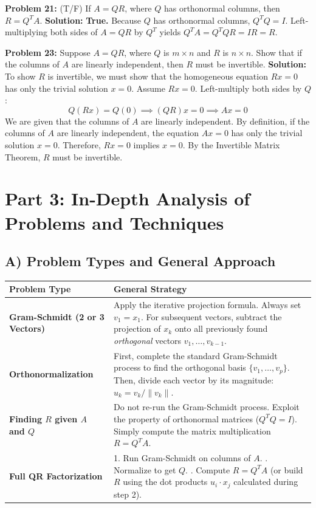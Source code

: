 \documentclass[11pt, letterpaper]{article}
\theoremstyle{definition}
\theoremstyle{remark}
\begin{document}
\vspace{1em}
\textbf{Problem 21:} (T/F) If $A = QR$, where $Q$ has orthonormal columns, then $R = Q^T A$.
\textbf{Solution:} \textbf{True.} Because $Q$ has orthonormal columns, $Q^T Q = I$. Left-multiplying both sides of $A = QR$ by $Q^T$ yields $Q^T A = Q^T Q R = I R = R$.

\vspace{1em}
\textbf{Problem 23:} Suppose $A = QR$, where $Q$ is $m \times n$ and $R$ is $n \times n$. Show that if the columns of $A$ are linearly independent, then $R$ must be invertible.
\textbf{Solution:} 
To show $R$ is invertible, we must show that the homogeneous equation $Rx = 0$ has only the trivial solution $x = 0$.
Assume $Rx = 0$. 
Left-multiply both sides by $Q$:
\[ Q(Rx) = Q(0) \implies (QR)x = 0 \implies Ax = 0 \]
We are given that the columns of $A$ are linearly independent. By definition, if the columns of $A$ are linearly independent, the equation $Ax = 0$ has only the trivial solution $x = 0$.
Therefore, $Rx = 0$ implies $x = 0$. By the Invertible Matrix Theorem, $R$ must be invertible.

\newpage
\section{Part 3: In-Depth Analysis of Problems and Techniques}

\subsection{A) Problem Types and General Approach}

\renewcommand{\arraystretch}{1.5}
\begin{tabularx}{\textwidth}{>{\raggedright\arraybackslash}p{4cm} X}
\toprule
\textbf{Problem Type} & \textbf{General Strategy} \\
\midrule
\textbf{Gram-Schmidt (2 or 3 Vectors)} & Apply the iterative projection formula. Always set $v_1 = x_1$. For subsequent vectors, subtract the projection of $x_k$ onto all previously found \textit{orthogonal} vectors $v_1, \dots, v_{k-1}$. \\
\addlinespace[4pt]
\textbf{Orthonormalization} & First, complete the standard Gram-Schmidt process to find the orthogonal basis $\{v_1, \dots, v_p\}$. Then, divide each vector by its magnitude: $u_k = v_k / \|v_k\|$. \\
\addlinespace[4pt]
\textbf{Finding $R$ given $A$ and $Q$} & Do not re-run the Gram-Schmidt process. Exploit the property of orthonormal matrices ($Q^T Q = I$). Simply compute the matrix multiplication $R = Q^T A$. \\
\addlinespace[4pt]
\textbf{Full QR Factorization} & 1. Run Gram-Schmidt on columns of $A$. \newline 2. Normalize to get $Q$. \newline 3. Compute $R = Q^T A$ (or build $R$ using the dot products $u_i \cdot x_j$ calculated during step 2). \\
\bottomrule
\end{tabularx}
\end{document}
